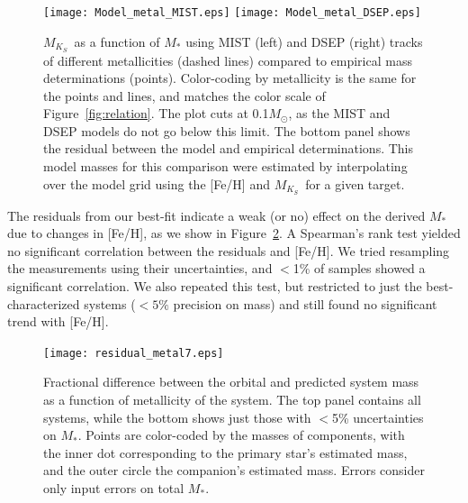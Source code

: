\documentclass[twocolumn]{aastex62}
\newcommand{\mks}{$M_{K_S}$}
\begin{document}
\begin{figure}[htp]
\begin{center}
\texttt{[image: Model\_metal\_MIST.eps]}
\texttt{[image: Model\_metal\_DSEP.eps]}
\caption{\mks\ as a function of $M_*$ using MIST (left) and DSEP (right) tracks of different metallicities (dashed lines) compared to empirical mass determinations (points). Color-coding by metallicity is the same for the points and lines, and matches the color scale of Figure~\ref{fig:relation}. The plot cuts at 0.1$M_\odot$, as the MIST and DSEP models do not go below this limit. The bottom panel shows the residual between the model and empirical determinations. This model masses for this comparison were estimated by interpolating over the model grid using the [Fe/H] and \mks\ for a given target. }
\label{fig:mk_metal}
\end{center}
\end{figure}

The residuals from our best-fit indicate a weak (or no) effect on the derived $M_*$ due to changes in [Fe/H], as we show in Figure~\ref{fig:metal_resid}. A Spearman's rank test yielded no significant correlation between the residuals and [Fe/H]. We tried resampling the measurements using their uncertainties, and $<$1\% of samples showed a significant correlation. We also repeated this test, but restricted to just the best-characterized systems ($<5\%$ precision on mass) and still found no significant trend with [Fe/H]. 

\begin{figure}[htp]
\begin{center}
\texttt{[image: residual\_metal7.eps]}
\caption{Fractional difference between the orbital and predicted system mass as a function of metallicity of the system. The top panel contains all systems, while the bottom shows just those with $<$5\% uncertainties on $M_*$. Points are color-coded by the masses of components, with the inner dot corresponding to the primary star's estimated mass, and the outer circle the companion's estimated mass. Errors consider only input errors on total $M_*$.}
\label{fig:metal_resid}
\end{center}
\end{figure}
\end{document}
